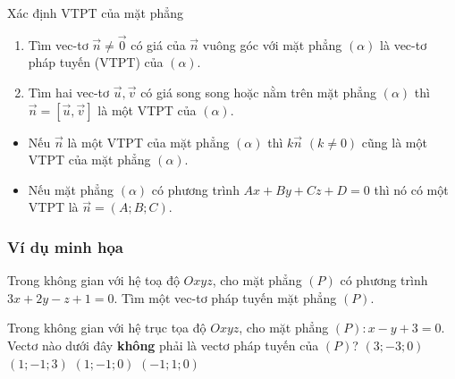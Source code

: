 \begin{dang}{Xác định VTPT của mặt phẳng}
	\begin{enumerate}
		\item Tìm vec-tơ $\overrightarrow{n}\neq \overrightarrow{0}$ có giá của $\overrightarrow{n}$ vuông góc với mặt phẳng $(\alpha)$ là vec-tơ pháp tuyến (VTPT) của $(\alpha)$.
		 \item Tìm hai vec-tơ $\overrightarrow{u},\overrightarrow{v}$ có giá song song hoặc nằm trên mặt phẳng $(\alpha)$ thì $\overrightarrow{n}=\left[\overrightarrow{u},\overrightarrow{v}\right]$ là một VTPT của $(\alpha)$.
		 
	\end{enumerate}
     \begin{note}
     \begin{itemize}
     	\item 	Nếu $\overrightarrow{n}$ là một VTPT của mặt phẳng $(\alpha)$ thì $k\overrightarrow{n}$ $(k\ne 0)$ cũng là một VTPT của mặt phẳng $(\alpha)$.
     	\item Nếu mặt phẳng $(\alpha)$ có phương trình $Ax+By+Cz+D=0$ thì nó có một VTPT là $\overrightarrow{n}=(A;B;C)$.
     	
     \end{itemize}
     \end{note}
	\end{dang}
\setcounter{subsubsection}{0}
\setcounter{vd}{0}
\setcounter{bt}{0}
\setcounter{ex}{0}
\subsubsection{Ví dụ minh họa}
\begin{vd}%
	Trong không gian với hệ toạ độ $Oxyz$, cho mặt phẳng $\left( P \right)$ có phương trình $3x+2y-z+1=0$. Tìm một vec-tơ pháp tuyến mặt phẳng $\left( P \right)$.
\end{vd}
\begin{vd}%
	Trong không gian với hệ trục tọa độ $Oxyz$, cho mặt phẳng $(P)\colon x-y+3=0$. Vectơ nào dưới đây \textbf{không} phải là vectơ pháp tuyến của $(P)$?
	\choice
	{$(3;-3;0)$}
	{\True $(1;-1;3)$}
	{$(1;-1;0)$}
	{$(-1;1;0)$}
\end{vd}

